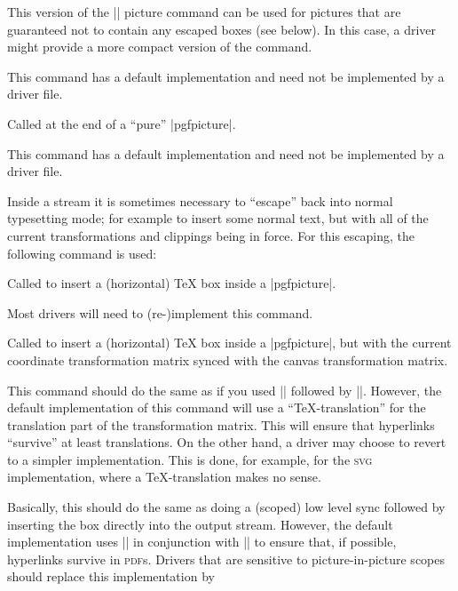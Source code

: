 \begin{command}{\pgfsys@beginpurepicture}
  This version of the |\pgfsys@beginpicture| picture command can be
  used for pictures that are guaranteed not to contain any escaped
  boxes (see below). In this case, a driver might provide a more
  compact version of the command.

  This command has a default implementation and need not be
  implemented by a driver file.
\end{command}

\begin{command}{\pgfsys@endpurepicture}
  Called at the end of a ``pure'' |{pgfpicture}|.

  This command has a default implementation and need not be
  implemented by a driver file.
\end{command}

Inside a stream it is sometimes necessary to ``escape'' back into
normal typesetting mode; for example to insert some normal text, but
with all of the current transformations and clippings being in
force. For this escaping, the following command is used:

\begin{command}{\pgfsys@hbox{}}
  Called to insert a (horizontal) TeX box inside a
  |{pgfpicture}|.

  Most drivers will need to (re-)implement this command.
\end{command}

\begin{command}{\pgfsys@hboxsynced{}}
  Called to insert a (horizontal) TeX box inside a
  |{pgfpicture}|, but with the current coordinate transformation
  matrix synced with the canvas transformation matrix.

  This command should do the same as if you used
  |\pgflowlevelsynccm| followed by |\pgfsys@hbox|. However, the default
  implementation of this command will use a ``TeX-translation'' for
  the translation part of the transformation matrix. This will ensure
  that hyperlinks ``survive'' at least translations. On the other
  hand, a driver may choose to revert to a simpler
  implementation. This is done, for example, for the \textsc{svg}
  implementation, where a \TeX-translation makes no sense.
\end{command}

\begin{command}{\pgfsys@pictureboxsynced{}}
  Basically, this should do the same as doing a (scoped) low level sync
  followed by inserting the box  directly into the
  output stream. However, the default implementation uses
  |\pgfsys@hboxsynced| in conjunction with |\pgfsys@beginpicture| to
  ensure that, if possible, hyperlinks survive in
  \textsc{pdf}s. Drivers that are sensitive to picture-in-picture
  scopes should replace this implementation by
\end{command}



